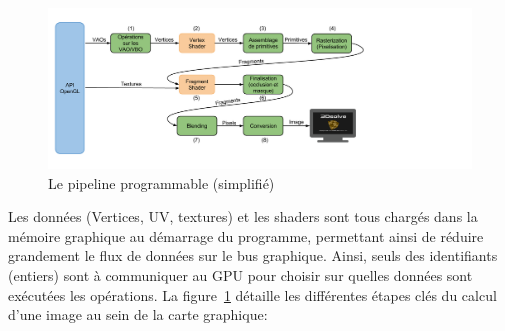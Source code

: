 \begin{figure}[h]
 \centering
 \includegraphics[scale=0.3,keepaspectratio=true]{img/pipeline.png}
 \caption{Le pipeline programmable (simplifié)}
 \label{pipeline}
\end{figure}

Les données (Vertices, UV, textures) et les shaders sont tous chargés dans la mémoire graphique au démarrage du programme, permettant ainsi de réduire grandement le flux de données sur le bus graphique. Ainsi, seuls des identifiants (entiers) sont à communiquer au GPU pour choisir sur quelles données sont exécutées les opérations.
    La figure~\ref{pipeline} détaille les différentes étapes clés du calcul d'une image au sein de la carte graphique:

